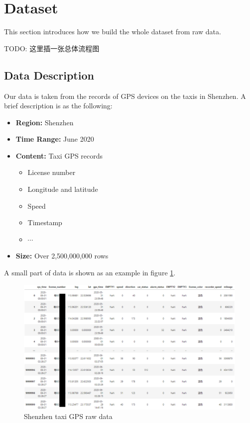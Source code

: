 
\section{Dataset}
This section introduces how we build the whole dataset from raw data.

TODO: 这里插一张总体流程图

\subsection{Data Description}
Our data is taken from the records of GPS devices on the taxis in Shenzhen. A brief description is as the following:
\begin{itemize}
    \item \textbf{Region:} Shenzhen
    \item \textbf{Time Range:} June 2020
    \item \textbf{Content:} Taxi GPS records
    \begin{itemize}
      \item License number
      \item Longitude and latitude
      \item Speed
      \item Timestamp
      \item $\cdots$
    \end{itemize}
  \item \textbf{Size:} Over 2,500,000,000 rows
\end{itemize}

A small part of data is shown as an example in figure \ref{fig: raw_data}.
\begin{figure}[htb]
    \centering
    \includegraphics[width=\textwidth]{images/raw_data.png}
    \caption{Shenzhen taxi GPS raw data}
    \label{fig: raw_data}
\end{figure}

